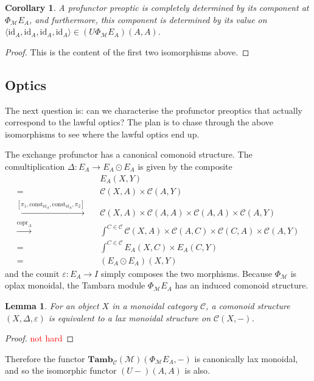 \documentclass[11pt,a4paper]{article}
\theoremstyle{plain}
\newtheorem{lemma}[theorem]{Lemma}
\newtheorem{corollary}[theorem]{Corollary}
\theoremstyle{definition}
\newcommand{\C}{\mathscr{C}}
\newcommand{\M}{\mathscr{M}}
\newcommand{\Pastro}{\Phi}
\newcommand{\Tamb}{\mathbf{Tamb}}
\newcommand{\id}{\mathrm{id}}
\newcommand{\const}{\mathrm{const}}
\DeclareMathOperator{\copr}{copr}
\newcommand{\todo}[1]{\textcolor{red}{\small #1}}
\begin{document}
\begin{corollary}
A profunctor preoptic is completely determined by its component at $\Pastro_\M E_A$, and furthermore, this component is determined by its value on $\langle \id_A, \id_A, \id_A, \id_A \rangle \in (U \Pastro_\M E_A)(A, A)$.
\end{corollary}
\begin{proof}
This is the content of the first two isomorphisms above.
\end{proof}

\subsection{Optics}

The next question is: can we characterise the profunctor preoptics that actually correspond to the lawful optics? The plan is to chase through the above isomorphisms to see where the lawful optics end up.

The exchange profunctor has a canonical comonoid structure. The comultiplication $\Delta : E_A \to E_A \odot E_A$ is given by the composite
\begin{align*}
&E_A(X,Y) \\
= \quad& \C(X, A) \times \C(A, Y) \\
\xrightarrow{[\pi_1, \const_{\id_A}, \const_{\id_A}, \pi_2]} \quad& \C(X, A) \times \C(A, A) \times \C(A, A) \times \C(A, Y) \\
\xrightarrow{\copr_A} \quad& \int^{C \in \C} \C(X, A) \times \C(A, C) \times \C(C, A) \times \C(A, Y) \\
= \quad& \int^{C \in \C} E_A(X,C) \times E_A(C,Y) \\
= \quad&  (E_A \odot E_A)(X,Y)
\end{align*}
and the counit $\varepsilon : E_A \to I$ simply composes the two morphisms. Because $\Pastro_\M$ is oplax monoidal, the Tambara module $\Pastro_\M E_A$ has an induced comonoid structure.

\begin{lemma}
For an object $X$ in a monoidal category $\C$, a comonoid structure $(X,\Delta,\varepsilon)$ is equivalent to a lax monoidal structure on $\C(X, -)$.
\end{lemma}
\begin{proof}
\todo{not hard}
\end{proof}

Therefore the functor $\Tamb_\C(\M)(\Pastro_\M E_A, -)$ is canonically lax monoidal, and so the isomorphic functor $(U-)(A,A)$ is also.
\end{document}
